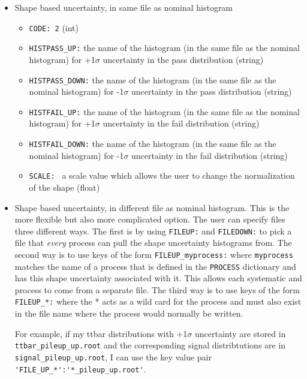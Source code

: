 \documentclass[letter]{article}
\begin{document}
            \begin{itemize}
                \item Shape based uncertainty, in same file as nominal histogram
                \begin{itemize}
                    \item \verb"CODE: 2" (int)
                    \item \verb"HISTPASS_UP:" the name of the histogram (in the same file as the nominal histogram) for +1$\sigma$ uncertainty in the pass distribution (string)
                    \item \verb"HISTPASS_DOWN:" the name of the histogram (in the same file as the nominal histogram) for -1$\sigma$ uncertainty in the pass distribution (string)
                    \item \verb"HISTFAIL_UP:" the name of the histogram (in the same file as the nominal histogram) for +1$\sigma$ uncertainty in the fail distribution (string)
                    \item \verb"HISTFAIL_DOWN:" the name of the histogram (in the same file as the nominal histogram) for -1$\sigma$ uncertainty in the fail distribution (string)
                    \item \verb"SCALE: " a scale value which allows the user to change the normalization of the shape (float)

                \end{itemize}
                \item Shape based uncertainty, in different file as nominal histogram. This is the more flexible but also more complicated option. 
                The user can specify files three different ways. The first is by using \verb"FILEUP:" and \verb"FILEDOWN:" to pick a file that \textit{every} process can pull the shape uncertainty histograms from. The second way is to use keys of the form \verb"FILEUP_myprocess:" where \verb"myprocess" matches the name of a process that is defined in the \verb"PROCESS" dictionary and has this shape uncertainty associated with it. This allows each systematic and process to come from a separate file. The third way is to use keys of the form \verb"FILEUP_*:" where the * acts as a wild card for the process and must also exist in the file name where the process would normally be written.

                For example, if my ttbar distributions with +1$\sigma$ uncertainty are stored in \verb"ttbar_pileup_up.root" and the corresponding signal distribtutions are in \verb"signal_pileup_up.root", I can use the key value pair \verb"'FILE_UP_*':'*_pileup_up.root'".


\end{itemize}
\end{document}
